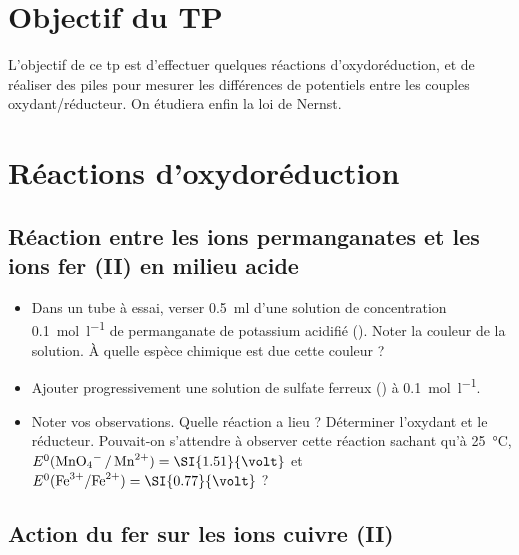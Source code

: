 \documentclass{tp}
\begin{document}

\section{Objectif du TP}
L'objectif de ce tp est d'effectuer quelques réactions d'oxydoréduction, et de réaliser des piles pour mesurer les différences de potentiels entre les couples oxydant/réducteur. On étudiera enfin la loi de Nernst.

\section{Réactions d'oxydoréduction}%
\label{sec:reactions_d_oxydoreduction}

\subsection{Réaction entre les ions permanganates et les ions fer (II) en milieu acide}%
\label{sub:reaction_entre_les_ions_permanganates_et_les_ions_fer_ii_en_milieu_acide}

\begin{itemize}
  \item Dans un tube à essai, verser \SI{0.5}{\milli\litre} d'une solution de concentration \SI{0.1}{\mol\per\litre} de permanganate de potassium acidifié (). Noter la couleur de la solution. À quelle espèce chimique est due cette couleur ?

  \item Ajouter progressivement une solution de sulfate ferreux () à \SI{0.1}{\mol\per\litre}.

  \item Noter vos observations. Quelle réaction a lieu ? Déterminer l'oxydant et le réducteur. Pouvait-on s'attendre à observer cette réaction sachant qu'à \SI{25}{\celsius}, $E^0(\ce{MnO4- / Mn^2+})=\SI{1.51}{\volt}$ et $E^0(\ce{Fe^3+/Fe^2+})=\SI{0.77}{\volt}$ ?  
\end{itemize}

\subsection{Action du fer sur les ions cuivre (II)}%
\label{sub:action_du_fer_sur_les_ions_cuivre_ii_}
\end{document}
